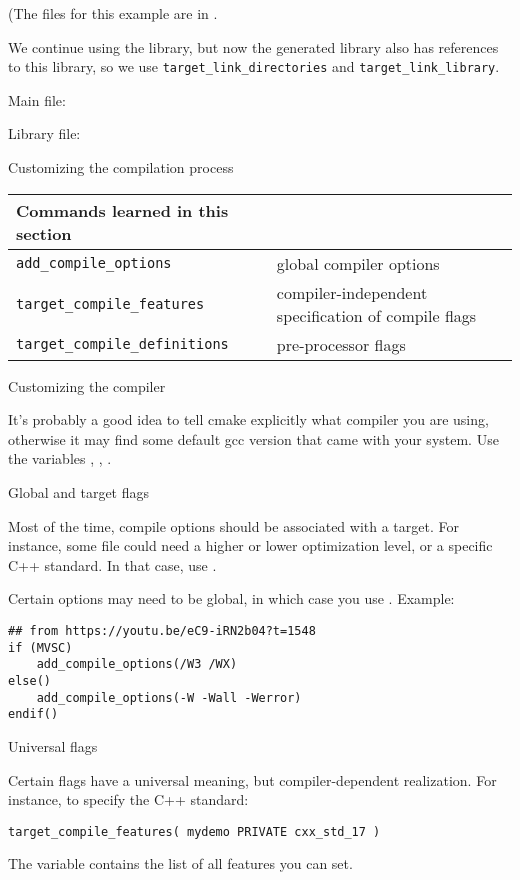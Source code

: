 (The files for this example are in .

We continue using the  library,
but now the generated library also has references to this library,
so we use \lstinline+target_link_directories+ and \lstinline+target_link_library+.

Main file:
%


Library file:
%



 {Customizing the compilation process}

\begin{tabular}{lp{3in}}
  \toprule
  Commands learned in this section\\
  \midrule
  \lstinline+add_compile_options+&global compiler options\\
  \lstinline+target_compile_features+&compiler-independent specification of compile flags\\
  \lstinline+target_compile_definitions+&pre-processor flags\\
  \bottomrule
\end{tabular}

 {Customizing the compiler}

It's probably a good idea to tell cmake explicitly what compiler you are using,
otherwise it may find some default gcc version that came with your system.
Use the variables , ,
.

 {Global and target flags}

Most of the time, compile options should be associated with a target.
For instance, some file could need a higher or lower optimization level,
or a specific C++ standard.
In that case, use .

Certain options may need to be global, in which case you use
. Example:
\begin{lstlisting}
## from https://youtu.be/eC9-iRN2b04?t=1548
if (MVSC)
    add_compile_options(/W3 /WX)
else()
    add_compile_options(-W -Wall -Werror)
endif()
\end{lstlisting}

 {Universal flags}

Certain flags have a universal meaning, but compiler-dependent realization.
For instance, to specify the C++ standard:
\begin{lstlisting}
target_compile_features( mydemo PRIVATE cxx_std_17 )
\end{lstlisting}
The variable 
contains the list of all features you can set.

